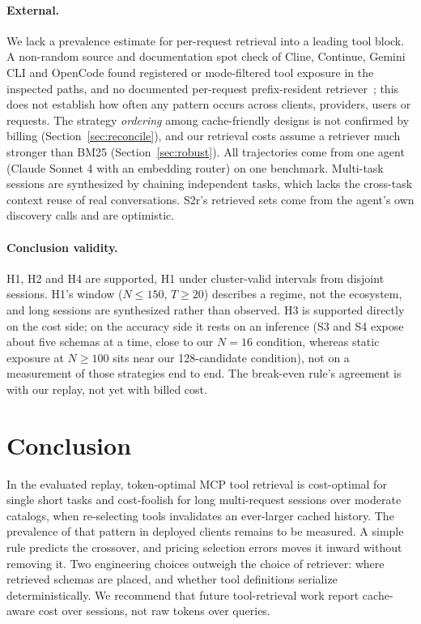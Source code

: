 \documentclass[11pt]{article}
\begin{document}
\paragraph{External.} We lack a prevalence estimate for per-request retrieval into a leading tool block. A non-random source and documentation spot check of Cline, Continue, Gemini CLI and OpenCode found registered or mode-filtered tool exposure in the inspected paths, and no documented per-request prefix-resident retriever~\cite{cline,continuedev,geminicli,opencode}; this does not establish how often any pattern occurs across clients, providers, users or requests. The strategy \emph{ordering} among cache-friendly designs is not confirmed by billing (Section~\ref{sec:reconcile}), and our retrieval costs assume a retriever much stronger than BM25 (Section~\ref{sec:robust}). All trajectories come from one agent (Claude Sonnet 4 with an embedding router) on one benchmark. Multi-task sessions are synthesized by chaining independent tasks, which lacks the cross-task context reuse of real conversations. S2r's retrieved sets come from the agent's own discovery calls and are optimistic.
\paragraph{Conclusion validity.} H1, H2 and H4 are supported, H1 under cluster-valid intervals from disjoint sessions. H1's window ($N \leq 150$, $T \geq 20$) describes a regime, not the ecosystem, and long sessions are synthesized rather than observed. H3 is supported directly on the cost side; on the accuracy side it rests on an inference (S3 and S4 expose about five schemas at a time, close to our $N{=}16$ condition, whereas static exposure at $N{\geq}100$ sits near our 128-candidate condition), not on a measurement of those strategies end to end. The break-even rule's agreement is with our replay, not yet with billed cost.

\section{Conclusion}
In the evaluated replay, token-optimal MCP tool retrieval is cost-optimal for single short tasks and cost-foolish for long multi-request sessions over moderate catalogs, when re-selecting tools invalidates an ever-larger cached history. The prevalence of that pattern in deployed clients remains to be measured. A simple rule predicts the crossover, and pricing selection errors moves it inward without removing it. Two engineering choices outweigh the choice of retriever: where retrieved schemas are placed, and whether tool definitions serialize deterministically. We recommend that future tool-retrieval work report cache-aware cost over sessions, not raw tokens over queries.
\end{document}
